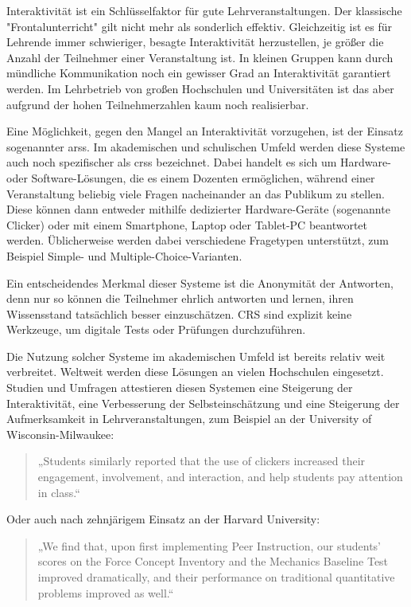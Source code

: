 Interaktivität ist ein Schlüsselfaktor für gute Lehrveranstaltungen. Der klassische "Frontalunterricht" gilt nicht mehr als sonderlich effektiv. Gleichzeitig ist es für Lehrende immer schwieriger, besagte Interaktivität herzustellen, je größer die Anzahl der Teilnehmer einer Veranstaltung ist. In kleinen Gruppen kann durch mündliche Kommunikation noch ein gewisser Grad an Interaktivität garantiert werden. Im Lehrbetrieb von großen Hochschulen und Universitäten ist das aber aufgrund der hohen Teilnehmerzahlen kaum noch realisierbar.

Eine Möglichkeit, gegen den Mangel an Interaktivität vorzugehen, ist der Einsatz sogenannter \acp{ars}. Im akademischen und schulischen Umfeld werden diese Systeme auch noch spezifischer als \acp{crs} bezeichnet. Dabei handelt es sich um Hardware- oder Software-Lösungen, die es einem Dozenten ermöglichen, während einer Veranstaltung beliebig viele Fragen nacheinander an das Publikum zu stellen. Diese können dann entweder mithilfe dedizierter Hardware-Geräte (sogenannte Clicker) oder mit einem Smartphone, Laptop oder Tablet-PC beantwortet werden. Üblicherweise werden dabei verschiedene Fragetypen unterstützt, zum Beispiel Simple- und Multiple-Choice-Varianten.

Ein entscheidendes Merkmal dieser Systeme ist die Anonymität der Antworten, denn nur so können die Teilnehmer ehrlich antworten und lernen, ihren Wissensstand tatsächlich besser einzuschätzen. CRS sind explizit keine Werkzeuge, um digitale Tests oder Prüfungen durchzuführen.

Die Nutzung solcher Systeme im akademischen Umfeld ist bereits relativ weit verbreitet. Weltweit werden diese Lösungen an vielen Hochschulen eingesetzt. Studien und Umfragen attestieren diesen Systemen eine Steigerung der Interaktivität, eine Verbesserung der Selbsteinschätzung und eine Steigerung der Aufmerksamkeit in Lehrveranstaltungen, zum Beispiel an der University of Wisconsin-Milwaukee\cite[S. 5]{web:wisconsin}:

\begin{quote}
„Students similarly reported that the use of clickers increased their engagement, involvement, and interaction, and help students pay attention in class.“
\end{quote}

Oder auch nach zehnjärigem Einsatz an der Harvard University\cite[S. 6]{web:tenyears}:

\begin{quote}
„We find that, upon first implementing Peer Instruction, our students’ scores on the Force Concept Inventory and the Mechanics Baseline Test improved dramatically, and their performance on traditional quantitative problems improved as well.“
\end{quote}


